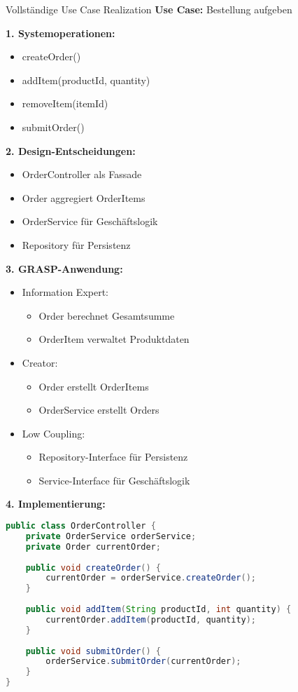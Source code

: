\begin{example2}{Vollständige Use Case Realization}
\textbf{Use Case:} Bestellung aufgeben

\textbf{1. Systemoperationen:}
\begin{itemize}
    \item createOrder()
    \item addItem(productId, quantity)
    \item removeItem(itemId)
    \item submitOrder()
\end{itemize}

\textbf{2. Design-Entscheidungen:}
\begin{itemize}
    \item OrderController als Fassade
    \item Order aggregiert OrderItems
    \item OrderService für Geschäftslogik
    \item Repository für Persistenz
\end{itemize}

\textbf{3. GRASP-Anwendung:}
\begin{itemize}
    \item Information Expert:
    \begin{itemize}
        \item Order berechnet Gesamtsumme
        \item OrderItem verwaltet Produktdaten
    \end{itemize}
    \item Creator:
    \begin{itemize}
        \item Order erstellt OrderItems
        \item OrderService erstellt Orders
    \end{itemize}
    \item Low Coupling:
    \begin{itemize}
        \item Repository-Interface für Persistenz
        \item Service-Interface für Geschäftslogik
    \end{itemize}
\end{itemize}

\textbf{4. Implementierung:}
\begin{lstlisting}[language=Java, style=basesmol]
public class OrderController {
    private OrderService orderService;
    private Order currentOrder;
    
    public void createOrder() {
        currentOrder = orderService.createOrder();
    }
    
    public void addItem(String productId, int quantity) {
        currentOrder.addItem(productId, quantity);
    }
    
    public void submitOrder() {
        orderService.submitOrder(currentOrder);
    }
}
\end{lstlisting}
\end{example2}

